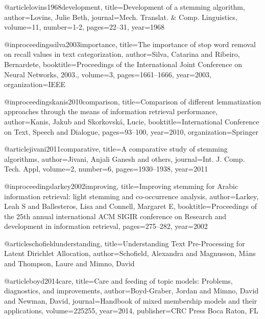 
@article{lovins1968development,
  title={Development of a stemming algorithm},
  author={Lovins, Julie Beth},
  journal={Mech. Translat. \& Comp. Linguistics},
  volume={11},
  number={1-2},
  pages={22--31},
  year={1968}
}

@inproceedings{silva2003importance,
  title={The importance of stop word removal on recall values in text categorization},
  author={Silva, Catarina and Ribeiro, Bernardete},
  booktitle={Proceedings of the International Joint Conference on Neural Networks, 2003.},
  volume={3},
  pages={1661--1666},
  year={2003},
  organization={IEEE}
}

@inproceedings{kanis2010comparison,
  title={Comparison of different lemmatization approaches through the means of information retrieval performance},
  author={Kanis, Jakub and Skorkovsk{\'a}, Lucie},
  booktitle={International Conference on Text, Speech and Dialogue},
  pages={93--100},
  year={2010},
  organization={Springer}
}

@article{jivani2011comparative,
  title={A comparative study of stemming algorithms},
  author={Jivani, Anjali Ganesh and others},
  journal={Int. J. Comp. Tech. Appl},
  volume={2},
  number={6},
  pages={1930--1938},
  year={2011}
}

@inproceedings{larkey2002improving,
  title={Improving stemming for Arabic information retrieval: light stemming and co-occurrence analysis},
  author={Larkey, Leah S and Ballesteros, Lisa and Connell, Margaret E},
  booktitle={Proceedings of the 25th annual international ACM SIGIR conference on Research and development in information retrieval},
  pages={275--282},
  year={2002}
}

@article{schofieldunderstanding,
  title={Understanding Text Pre-Processing for Latent Dirichlet Allocation},
  author={Schofield, Alexandra and Magnusson, M{\aa}ns and Thompson, Laure and Mimno, David}
}

@article{boyd2014care,
  title={Care and feeding of topic models: Problems, diagnostics, and improvements},
  author={Boyd-Graber, Jordan and Mimno, David and Newman, David},
  journal={Handbook of mixed membership models and their applications},
  volume={225255},
  year={2014},
  publisher={CRC Press Boca Raton, FL}
}

